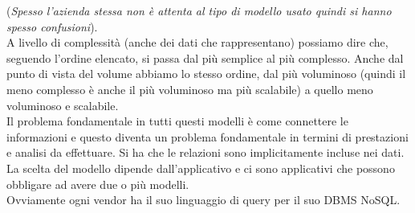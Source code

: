 \documentclass[a4paper,12pt, oneside]{book}
\begin{document}
(\textit{Spesso l'azienda stessa non è attenta al tipo di modello usato quindi
  si hanno spesso confusioni}).\\
A livello di complessità (anche dei dati che rappresentano) possiamo dire che,
seguendo l'ordine elencato, si passa dal più semplice al più complesso. Anche
dal punto di vista del volume abbiamo lo stesso ordine, dal più voluminoso
(quindi il meno complesso è anche il più voluminoso ma più scalabile) a quello
meno voluminoso e scalabile.\\
Il problema fondamentale in tutti questi modelli è come connettere le
informazioni e questo diventa un problema fondamentale in termini di prestazioni
e analisi da effettuare. Si ha che le relazioni sono implicitamente incluse nei
dati. La scelta del modello dipende dall'applicativo e ci sono applicativi che
possono obbligare ad avere due o più modelli.\\
Ovviamente ogni vendor ha il suo linguaggio di query per il suo DBMS NoSQL.
\end{document}
